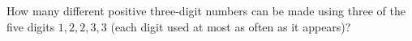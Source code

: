 How many different positive three-digit numbers can be made using three of the five digits $1,2,2,3,3$ (each digit used at most as often as it appears)?

